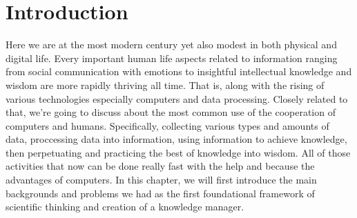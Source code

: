 \chapter{Introduction}
\label{chap:introduction}

Here we are at the most modern century yet also modest in both physical and digital life.
Every important human life aspects related to information ranging from social communication with emotions to insightful intellectual knowledge and wisdom are more rapidly thriving all time.
That is, along with the rising of various technologies especially computers and data processing.
Closely related to that, we're going to discuss about the most common use of the cooperation of computers and humans.
Specifically, collecting various types and amounts of data, proccessing data into information, using information to achieve knowledge, then perpetuating and practicing the best of knowledge into wisdom.
All of those activities that now can be done really fast with the help and because the advantages of computers.
In this chapter, we will first introduce the main backgrounds and problems we had as the first foundational framework of scientific thinking and creation of a knowledge manager.
